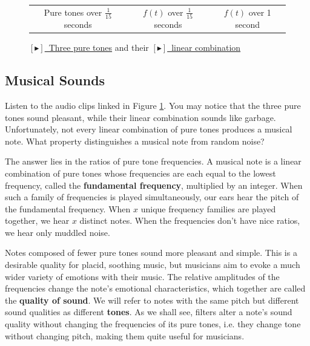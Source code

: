 \begin{figure}[h]
\begin{tabular}{ccc}
        Pure tones over $\frac{1}{15}$ seconds & $f(t)$ over $\frac{1}{15}$ seconds & $f(t)$ over 1 second\\
    \end{tabular}
    \caption{\href{https://drive.google.com/file/d/14drILSPmpc9H5VRfpYbGys3hszOjLL5u/view?usp=sharing}{\color{blue} $[\blacktriangleright]$~Three pure tones} and their \href{https://drive.google.com/file/d/1Qn-Je4ouRklJgiG2mEWmEwjWkEo9rs8y/view?usp=sharing}{\color{blue} $[\blacktriangleright]$~linear combination}}
    \label{fig:cluster_sum}
\end{figure}

\subsection{Musical Sounds}

\par \indentt Listen to the audio clips linked in Figure \ref{fig:cluster_sum}. You may notice that the three pure tones sound pleasant, while their linear combination sounds like garbage. Unfortunately, not every linear combination of pure tones produces a musical note. What property distinguishes a musical note from random noise?

\par \bigskip The answer lies in the ratios of pure tone frequencies. A musical note is a linear combination of pure tones whose frequencies are each equal to the lowest frequency, called the \textbf{fundamental frequency}, multiplied by an integer.\cite{Pierce} When such a family of frequencies is played simultaneously, our ears hear the pitch of the fundamental frequency. When $x$ unique frequency families are played together, we hear $x$ distinct notes. When the frequencies don't have nice ratios, we hear only muddled noise.

\par \bigskip Notes composed of fewer pure tones sound more pleasant and simple. This is a desirable quality for placid, soothing music, but musicians aim to evoke a much wider variety of emotions with their music. The relative amplitudes of the frequencies change the note's emotional characteristics, which together are called the \textbf{quality of sound}. We will refer to notes with the same pitch but different sound qualities as different \textbf{tones}. As we shall see, filters alter a note's sound quality without changing the frequencies of its pure tones, i.e. they change tone without changing pitch, making them quite useful for musicians.